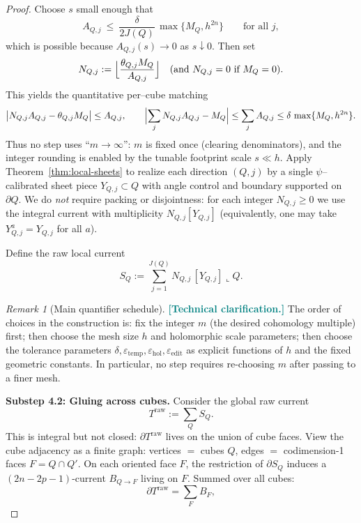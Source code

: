 \documentclass[11pt]{article}
\newcommand{\REVMZ}[1]{\textcolor{teal}{#1}}  %
\numberwithin{equation}{section}  %
\theoremstyle{plain}
\theoremstyle{definition}
\theoremstyle{remark}
\newtheorem{remark}[theorem]{Remark}
\begin{document}
\begin{proof}
Choose $s$ small enough that
\[
A_{Q,j}\ \le\ {\frac{\delta}{2J(Q)}}\,\max\{M_Q,h^{2n}\}
\qquad\text{for all }j,
\]
which is possible because $A_{Q,j}(s)\to0$ as $s\downarrow0$.
Then set
\[
N_{Q,j}:=\Bigl\lfloor \frac{\theta_{Q,j}M_Q}{A_{Q,j}}\Bigr\rfloor
\quad(\text{and }N_{Q,j}=0\text{ if }M_Q=0).
\]
This yields the quantitative per--cube matching
\[
\bigl|N_{Q,j}A_{Q,j}-\theta_{Q,j}M_Q\bigr|\le A_{Q,j},
\qquad
\Bigl|\sum_j N_{Q,j}A_{Q,j}-M_Q\Bigr|\le \sum_j A_{Q,j}\le \delta\,\max\{M_Q,h^{2n}\}.
\]
Thus no step uses ``$m\to\infty$'': $m$ is fixed once (clearing denominators), and the integer rounding is enabled by the tunable footprint scale $s\ll h$.
{Apply Theorem~\ref{thm:local-sheets} to realize each direction $(Q,j)$ by a single $\psi$--calibrated sheet piece $Y_{Q,j}\subset Q$
with angle control and boundary supported on $\partial Q$.  We do \emph{not} require packing or disjointness: for each integer $N_{Q,j}\ge 0$ we use the integral current with
multiplicity $N_{Q,j}[Y_{Q,j}]$ (equivalently, one may take $Y_{Q,j}^a=Y_{Q,j}$ for all $a$).}

Define the raw local current
\[
S_Q:=\sum_{j=1}^{J(Q)} N_{Q,j}\,[Y_{Q,j}]\llcorner Q.
\]



\begin{remark}[Main quantifier schedule]\label{rem:main-quantifiers}
\REVMZ{\textbf{[Technical clarification.]}}
The order of choices in the construction is: fix the integer $m$ (the desired cohomology multiple) first; then choose the mesh size $h$ and holomorphic scale parameters; then choose the tolerance parameters $\delta,\varepsilon_{\mathrm{temp}},\varepsilon_{\mathrm{hol}},\varepsilon_{\mathrm{edit}}$ as explicit functions of $h$ and the fixed geometric constants. In particular, no step requires re-choosing $m$ after passing to a finer mesh.
\end{remark}

\medskip\noindent
\textbf{Substep 4.2: Gluing across cubes.}
Consider the global raw current
\[
T^{\mathrm{raw}}:=\sum_Q S_Q.
\]
This is integral but not closed: $\partial T^{\mathrm{raw}}$ lives on
the union of cube faces.  View the cube adjacency as a finite graph:
vertices $=$ cubes $Q$, edges $=$ codimension-1 faces $F=Q\cap Q'$.
On each oriented face $F$, the restriction of $\partial S_Q$ induces
a $(2n-2p-1)$-current $B_{Q\to F}$ living on $F$.  Summed over all cubes:
\[
\partial T^{\mathrm{raw}}=\sum_F B_F,
\]


\end{proof}
\end{document}
